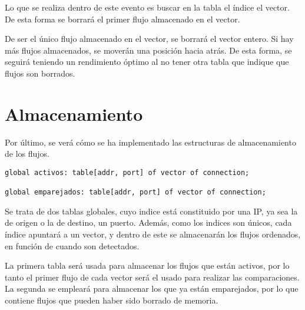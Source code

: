 \intro Lo que se realiza dentro de este evento es buscar en la tabla el índice el vector. De esta forma 
se borrará el primer flujo almacenado en el vector.

\intro De ser el único flujo almacenado en el vector, se borrará el vector entero. Si hay más flujos almacenados, se moverán una 
posición hacia atrás. De esta forma, se seguirá teniendo un rendimiento óptimo al no tener otra tabla que indique que flujos son 
borrados.

\section{Almacenamiento}

\intro Por último, se verá cómo se ha implementado las estructuras de almacenamiento de los flujos.

\begin{lstlisting}[style=CodigoC]
global activos: table[addr, port] of vector of connection;

global emparejados: table[addr, port] of vector of connection;
\end{lstlisting}

\intro Se trata de dos tablas globales, cuyo indice está constituido por una IP, ya sea la de origen o la de destino, un puerto. 
Además, como los indices son únicos, cada índice apuntará a un vector, y dentro de este se almacenarán los flujos ordenados, en 
función de cuando son detectados.

\intro La primera tabla será usada para almacenar los flujos que están activos, por lo tanto el primer flujo de cada vector será el 
usado para realizar las comparaciones. La segunda se empleará para almacenar los que ya están emparejados, por lo que contiene flujos 
que pueden haber sido borrado de memoria.
